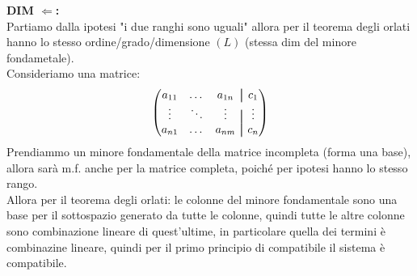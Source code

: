 \textbf{DIM $\Leftarrow$:}\\
Partiamo dalla ipotesi "i due ranghi sono uguali" allora per il teorema degli orlati hanno lo stesso ordine/grado/dimensione $(L)$ (stessa dim del minore fondametale).\\
Consideriamo una matrice:
$$
\begin{pmatrix}
a_{11} & \dots & a_{1n} &\aug& c_1 \\
\vdots & \ddots & \vdots &\aug& \vdots \\
a_{n1} & \dots & a_{nm} &\aug& c_n 
\end{pmatrix}
$$
Prendiammo un minore fondamentale della matrice incompleta (forma una base), allora sarà m.f. anche per la matrice completa, poiché per ipotesi hanno lo stesso rango.\\
Allora per il teorema degli orlati: le colonne del minore fondamentale sono una base per il sottospazio generato da tutte le colonne, quindi
tutte le altre colonne sono combinazione lineare di quest'ultime, in particolare quella dei termini è combinazine lineare, quindi per il primo principio di compatibile il sistema è compatibile.

